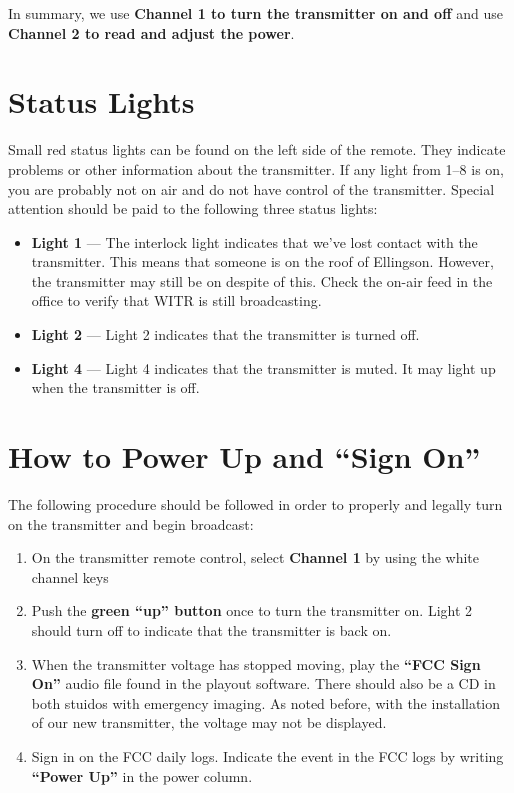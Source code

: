 \documentclass{witrman}
\begin{document}
In summary, we use \textbf{Channel 1 to turn the transmitter on and off} and use
\textbf{Channel 2 to read and adjust the power}.

\section{Status Lights}
Small red status lights can be found on the left side of the remote. They
indicate problems or other information about the transmitter. If any light from
1--8 is on, you are probably not on air and do not have control of the
transmitter. Special attention should be paid to the following three status
lights:
\begin{itemize}
    \item \textbf{Light 1} --- The interlock light indicates that we’ve lost
        contact with the transmitter. This means that someone is on the roof of
        Ellingson. However, the transmitter may still be on despite of this.
        Check the on-air feed in the office to verify that WITR is still
        broadcasting.
    \item \textbf{Light 2} --- Light 2 indicates that the transmitter is turned
        off.
    \item \textbf{Light 4} --- Light 4 indicates that the transmitter is muted.
        It may light up when the transmitter is off.
\end{itemize}

\section{How to Power Up and ``Sign On''}
The following procedure should be followed in order to properly and legally turn
on the transmitter and begin broadcast:
\begin{enumerate}
    \item On the transmitter remote control, select \textbf{Channel 1} by using
        the white channel keys
    \item Push the \textbf{green ``up'' button} once to turn the transmitter on.
        Light 2 should turn off to indicate that the transmitter is back on.
    \item When the transmitter voltage has stopped moving, play the
        \textbf{``FCC Sign On''} audio file found in the playout software. There
        should also be a CD in both stuidos with emergency imaging. As noted
        before, with the installation of our new transmitter, the voltage may
        not be displayed.
    \item Sign in on the FCC daily logs. Indicate the event in the FCC logs by
        writing \textbf{``Power Up''} in the power column.
\end{enumerate}
\end{document}
